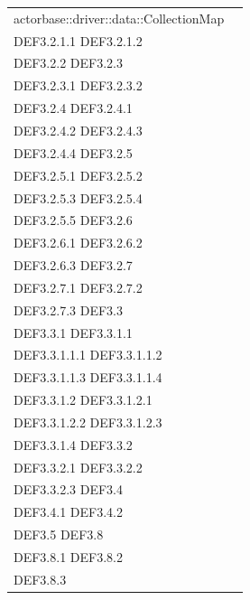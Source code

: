 \documentclass{scalatekids-article}
\begin{document}
\begin{longtable}[H]{|p{12cm}|p{5.5cm}|}
  actorbase::driver::data::CollectionMap & \multiLineCell[t]{DEF3.2 DEF3.2.1\\DEF3.2.1.1 DEF3.2.1.2\\DEF3.2.2 DEF3.2.3\\DEF3.2.3.1 DEF3.2.3.2\\DEF3.2.4 DEF3.2.4.1\\DEF3.2.4.2 DEF3.2.4.3\\DEF3.2.4.4 DEF3.2.5\\DEF3.2.5.1 DEF3.2.5.2\\DEF3.2.5.3 DEF3.2.5.4\\DEF3.2.5.5 DEF3.2.6\\DEF3.2.6.1 DEF3.2.6.2\\DEF3.2.6.3 DEF3.2.7\\DEF3.2.7.1 DEF3.2.7.2\\DEF3.2.7.3 DEF3.3\\DEF3.3.1 DEF3.3.1.1\\DEF3.3.1.1.1 DEF3.3.1.1.2\\DEF3.3.1.1.3 DEF3.3.1.1.4\\DEF3.3.1.2 DEF3.3.1.2.1\\DEF3.3.1.2.2 DEF3.3.1.2.3\\DEF3.3.1.4 DEF3.3.2\\DEF3.3.2.1 DEF3.3.2.2\\DEF3.3.2.3 DEF3.4\\DEF3.4.1 DEF3.4.2\\DEF3.5 DEF3.8\\DEF3.8.1 DEF3.8.2\\DEF3.8.3}\\
  \hline
\end{longtable}
\end{document}

